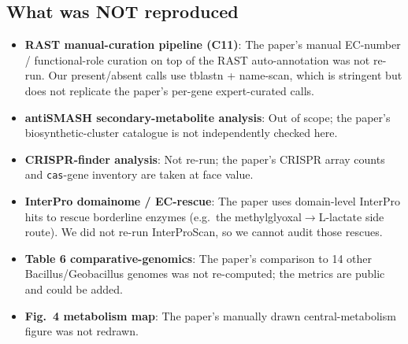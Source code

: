 \documentclass[11pt]{article}
\begin{document}
\subsection{What was NOT reproduced}
\begin{itemize}
  \item \textbf{RAST manual-curation pipeline (C11)}: The paper's manual EC-number / functional-role curation on top of the RAST auto-annotation was not re-run. Our present/absent calls use tblastn + name-scan, which is stringent but does not replicate the paper's per-gene expert-curated calls.
  \item \textbf{antiSMASH secondary-metabolite analysis}: Out of scope; the paper's biosynthetic-cluster catalogue is not independently checked here.
  \item \textbf{CRISPR-finder analysis}: Not re-run; the paper's CRISPR array counts and \texttt{cas}-gene inventory are taken at face value.
  \item \textbf{InterPro domainome / EC-rescue}: The paper uses domain-level InterPro hits to rescue borderline enzymes (e.g.\ the methylglyoxal$\to$L-lactate side route). We did not re-run InterProScan, so we cannot audit those rescues.
  \item \textbf{Table 6 comparative-genomics}: The paper's comparison to 14 other Bacillus/Geobacillus genomes was not re-computed; the metrics are public and could be added.
  \item \textbf{Fig.\ 4 metabolism map}: The paper's manually drawn central-metabolism figure was not redrawn.
\end{itemize}
\end{document}
